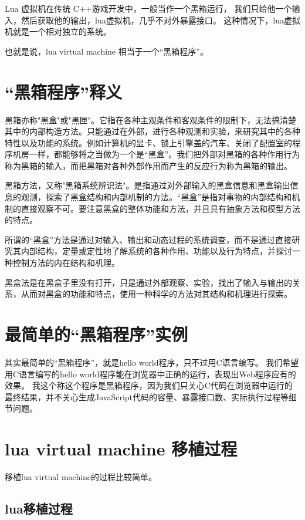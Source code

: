 Lua 虚拟机在传统 C++游戏开发中，一般当作一个黑箱运行，
我们只给他一个输入，然后获取他的输出，lua虚拟机，几乎不对外暴露接口。
这种情况下，lua虚拟机就是一个相对独立的系统。

也就是说，lua virtual machine 相当于一个“黑箱程序”。

\section{“黑箱程序”释义}

黑箱亦称"黑盒"或"黑匣"。它指在各种主观条件和客观条件的限制下，无法搞清楚其中的内部构造方法。只能通过在外部，进行各种观测和实验，来研究其中的各种特性以及功能的系统。例如计算机的显卡、锁上引擎盖的汽车、关闭了配置室的程序机房一样，都能够将之当做为一个是“黑盒”。我们把外部对黑箱的各种作用行为称为黑箱的输入，而把黑箱对各种外部作用而产生的反应行为称为黑箱的输出。

黑箱方法，又称"黑箱系统辨识法"。是指通过对外部输入的黑盒信息和黑盒输出信息的观测，探索了黑盒结构和内部机制的方法。“黑盒”是指对事物的内部结构和机制的直接观察不可。要注意黑盒的整体功能和方法，并且具有抽象方法和模型方法的特点。

所谓的“黑盒”方法是通过对输入、输出和动态过程的系统调查，而不是通过直接研究其内部结构，定量或定性地了解系统的各种作用、功能以及行为特点，并探讨一种控制方法的内在结构和机理。

黑盒法是在黑盒子里没有打开，只是通过外部观察、实验，找出了输入与输出的关系，从而对黑盒的功能和特点，使用一种科学的方法对其结构和机理进行探索。


\section{最简单的“黑箱程序”实例}

其实最简单的“黑箱程序”，就是hello world程序，只不过用C语言编写。
我们希望用C语言编写的hello world程序能在浏览器中正确的运行，表现出Web程序应有的效果。
我这个称这个程序是黑箱程序，因为我们只关心C代码在浏览器中运行的最终结果，并不关心生成JavaScript代码的容量、暴露接口数、实际执行过程等细节问题。

\section{lua virtual machine 移植过程}

移植lua virtual machine的过程比较简单。

\subsection{lua移植过程}

